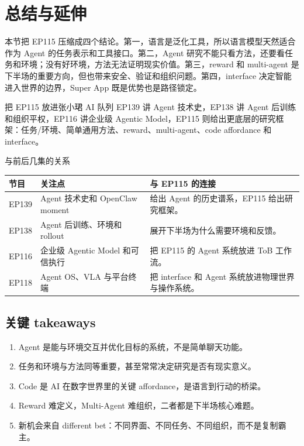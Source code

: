 \section{总结与延伸}

本节把 EP115 压缩成四个结论。第一，语言是泛化工具，所以语言模型天然适合作为 Agent 的任务表示和工具接口。第二，Agent 研究不能只看方法，还要看任务和环境；没有好环境，方法无法证明现实价值。第三，reward 和 multi-agent 是下半场的重要方向，但也带来安全、验证和组织问题。第四，interface 决定智能进入世界的边界，Super App 既是优势也是路径锁定。

\begin{importantbox}{把 EP115 放进张小珺 AI 队列}
EP139 讲 Agent 技术史，EP138 讲 Agent 后训练和组织平权，EP116 讲企业级 Agentic Model，EP115 则给出更底层的研究框架：任务/环境、简单通用方法、reward、multi-agent、code affordance 和 interface。
\end{importantbox}

\begin{knowledgebox}{与前后几集的关系}
\begin{tabularx}{\textwidth}{p{}p{}X}
\toprule
节目 & 关注点 & 与 EP115 的连接 \\
\midrule
EP139 & Agent 技术史和 OpenClaw moment & 给出 Agent 的历史谱系，EP115 给出研究框架。 \\
EP138 & Agent 后训练、环境和 rollout & 展开下半场为什么需要环境和反馈。 \\
EP116 & 企业级 Agentic Model 和可信执行 & 把 EP115 的 Agent 系统放进 ToB 工作流。 \\
EP118 & Agent OS、VLA 与平台终端 & 把 interface 和 Agent 系统放进物理世界与操作系统。 \\
\bottomrule
\end{tabularx}
\end{knowledgebox}

\subsection{关键 takeaways}

\begin{enumerate}
\item Agent 是能与环境交互并优化目标的系统，不是简单聊天功能。
\item 任务和环境与方法同等重要，甚至常常决定研究是否有现实意义。
\item Code 是 AI 在数字世界里的关键 affordance，是语言到行动的桥梁。
\item Reward 难定义，Multi-Agent 难组织，二者都是下半场核心难题。
\item 新机会来自 different bet：不同界面、不同任务、不同组织，而不是复制霸主。
\end{enumerate}

